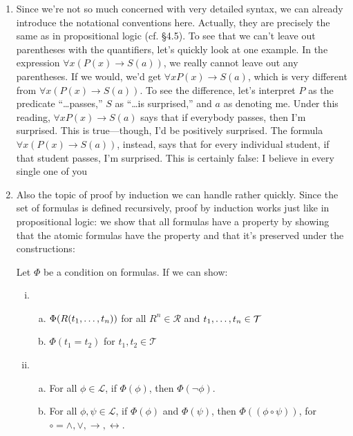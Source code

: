 \begin{enumerate}[\thesection.1]
		\item Since we're not so much concerned with very detailed syntax, we can already introduce the notational conventions here. Actually, they are precisely the same as in propositional logic (cf. \S4.5). To see that we can't leave out parentheses with the quantifiers, let's quickly look at one example. In the expression $\forall x(P(x)\to S(a))$, we really cannot leave out any parentheses. If we would, we'd get $\forall xP(x)\to S(a)$, which is very different from $\forall x(P(x)\to S(a))$. To see the difference, let's interpret $P$ as the predicate ``\dots passes,'' $S$ as ``\dots is surprised,'' and $a$ as denoting me. Under this reading, $\forall xP(x)\to S(a)$ says that if everybody passes, then I'm surprised. This is true---though, I'd be positively surprised. The formula  $\forall x(P(x)\to S(a))$, instead, says that for every individual student, if that student passes, I'm surprised. This is certainly false: I believe in every single one of you \smiley
		
		\item Also the topic of proof by induction we can handle rather quickly. Since the set of formulas is defined recursively, proof by induction works just like in propositional logic: we show that all formulas have a property by showing that the atomic formulas have the property and that it's preserved under the constructions:
		 \begin{theorem}
		Let $\Phi$ be a condition on formulas. If we can show:
		\begin{enumerate}[(i)]
		
			\item  \begin{enumerate}[(a)]
			
				\item $\Phi(R(t_1,\mathellipsis, t_n))$ for all $R^n\in \mathcal{R}$ and $t_1,\mathellipsis, t_n\in\mathcal{T}$
				
				\item $\Phi(t_1=t_2)$ for $t_1,t_2\in \mathcal{T}$
			
			\end{enumerate}
			
			\item \begin{enumerate}[(a)]
			
			\item For all $\phi\in\mathcal{L}$, if $\Phi(\phi)$, then $\Phi(\neg\phi)$.

			\item For all $\phi,\psi\in\mathcal{L}$, if $\Phi(\phi)$ and $\Phi(\psi)$, then $\Phi((\phi\circ\psi))$, for $\circ=\land,\lor,\to,\leftrightarrow$.
			

\end{enumerate}
\end{enumerate}
\end{theorem}
\end{enumerate}
